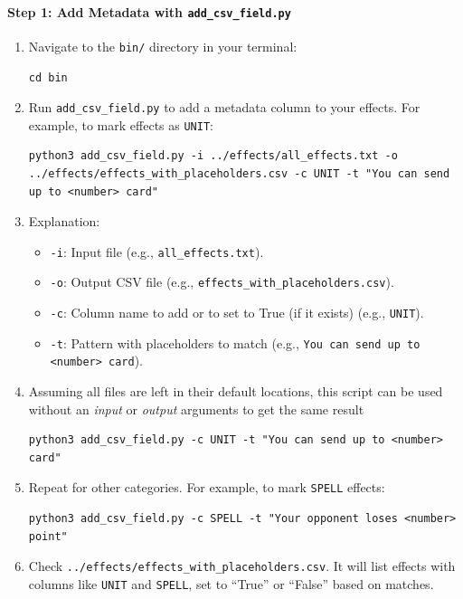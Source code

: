 \paragraph{Step 1: Add Metadata with \texttt{add\_csv\_field.py}}
\begin{enumerate}
	\item Navigate to the \texttt{bin/} directory in your terminal:
\begin{lstlisting}[style=terminalstyle]
cd bin
\end{lstlisting}
	\item Run \texttt{add\_csv\_field.py} to add a metadata column to your effects. For example, to mark effects as \texttt{UNIT}:
\begin{lstlisting}[style=terminalstyle]
python3 add_csv_field.py -i ../effects/all_effects.txt -o ../effects/effects_with_placeholders.csv -c UNIT -t "You can send up to <number> card"
\end{lstlisting}
	\item Explanation:
	\begin{itemize}
		\item \texttt{-i}: Input file (e.g., \texttt{all\_effects.txt}).
		\item \texttt{-o}: Output CSV file (e.g., \texttt{effects\_with\_placeholders.csv}).
		\item \texttt{-c}: Column name to add or to set to True (if it exists) (e.g., \texttt{UNIT}).
		\item \texttt{-t}: Pattern with placeholders to match (e.g., \texttt{You can send up to <number> card}).
	\end{itemize}
	\item Assuming all files are left in their default locations, this script can be used without an \textit{input} or \textit{output} arguments to get the same result
\begin{lstlisting}[style=terminalstyle]
python3 add_csv_field.py -c UNIT -t "You can send up to <number> card"
\end{lstlisting}
	\item Repeat for other categories. For example, to mark \texttt{SPELL} effects:
\begin{lstlisting}[style=terminalstyle]
python3 add_csv_field.py -c SPELL -t "Your opponent loses <number> point"
\end{lstlisting}
	\item Check \texttt{../effects/effects\_with\_placeholders.csv}. It will list effects with columns like \texttt{UNIT} and \texttt{SPELL}, set to ``True'' or ``False'' based on matches.
\end{enumerate}

